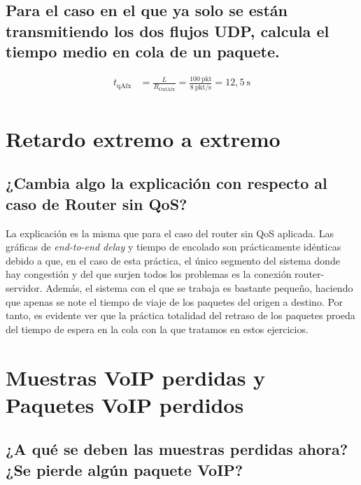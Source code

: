 \vspace{0,3cm}

\subsection{Para el caso en el que ya solo se están transmitiendo los dos flujos UDP, calcula el tiempo medio en cola de
un paquete.}
\[
    \begin{aligned}
        t_{\text{qAfx}} &= \frac{L}{R_{\text{OutAfx}}} = \frac{100~\text{pkt}}{8~\text{pkt/s}}= 12,5~\text{s} \\
    \end{aligned}
\]

\vspace{1cm}

\section{Retardo extremo a extremo}

\subsection{¿Cambia algo la explicación con respecto al caso de Router sin QoS?}
La explicación es la misma que para el caso del router sin QoS aplicada. Las gráficas de \textit{end-to-end delay}
y tiempo de encolado son prácticamente idénticas debido a que, en el caso de esta práctica, el único segmento del 
sistema donde hay congestión y del que surjen todos los problemas es la conexión router-servidor. Además, el sistema
con el que se trabaja es bastante pequeño, haciendo que apenas se note el tiempo de viaje de los paquetes del origen 
a destino. Por tanto, es evidente ver que la práctica totalidad del retraso de los paquetes proeda del tiempo de 
espera en la cola con la que tratamos en estos ejercicios.

\vspace{1cm}

\section{Muestras VoIP perdidas y Paquetes VoIP perdidos}

\subsection{¿A qué se deben las muestras perdidas ahora? ¿Se pierde algún paquete VoIP?}

